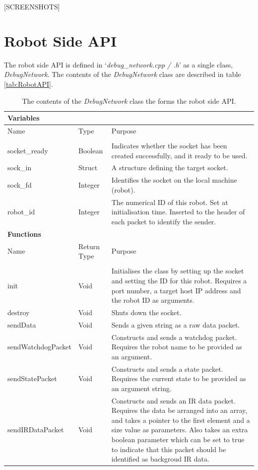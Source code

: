 [SCREENSHOTS]


\section{Robot Side API} \label{RobotSide}
The robot side API is defined in `\textit{debug\_network.cpp / .h}' as a single class, \textit{DebugNetwork}. The contents of the \textit{DebugNetwork} class are described in table \ref{tab:RobotAPI}.

\begin{longtable}{ l l p{8cm} }
\caption[Robot API]{The contents of the \textit{DebugNetwork} class the forms the robot side API.}\\
 \hline
 \multicolumn{3}{l}{\textbf{Variables}} \\
 \hline
 Name & Type & Purpose\\
 \hline\\
 socket\_ready & Boolean & Indicates whether the socket has been created successfully, and it ready to be used.\\
 sock\_in & Struct & A structure defining the target socket.\\
 sock\_fd & Integer & Identifies the socket on the local machine (robot).\\
 robot\_id & Integer & The numerical ID of this robot. Set at initialisation time. Inserted to the header of each packet to identify the sender.\\
 \hline
 \multicolumn{3}{l}{\textbf{Functions}} \\
 \hline
 Name & Return Type & Purpose\\
 \hline\\
 init & Void & Initialises the class by setting up the socket and setting the ID for this robot. Requires a port number, a target host IP address and the robot ID as arguments. \\
 destroy & Void & Shuts down the socket. \\
 sendData & Void & Sends a given string as a raw data packet. \\
 sendWatchdogPacket & Void & Constructs and sends a watchdog packet. Requires the robot name to be provided as an argument. \\
 sendStatePacket & Void & Constructs and sends a state packet. Requires the current state to be provided as an argument string. \\
 sendIRDataPacket & Void & Constructs and sends an IR data packet. Requires the data be arranged into an array, and takes a pointer to the first element and a size value as parameters. Also takes an extra boolean parameter which can be set to true to indicate that this packet should be identified as backgroud IR data.\\

\end{longtable}
